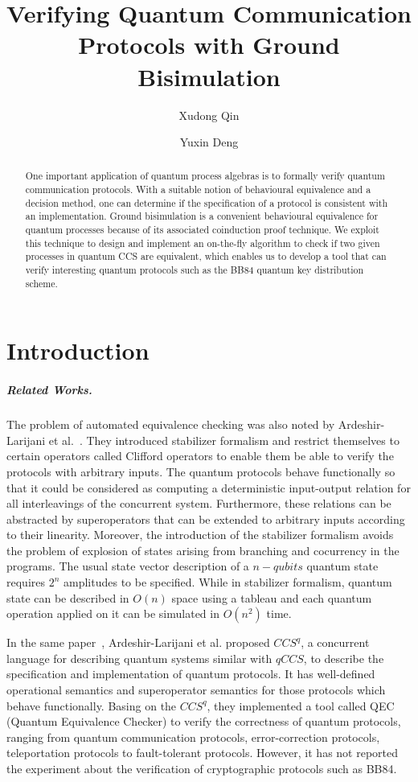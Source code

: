 \documentclass[a4paper,UKenglish,cleveref, autoref]{lipics-v2019}
\title{Verifying Quantum Communication Protocols with Ground Bisimulation}
\author{Xudong Qin}{Shanghai Key Laboratory of Trustworthy Computing, East China Normal University, China}{marsxd@gmail.com}{}{}
\author{Yuxin Deng}{Shanghai Key Laboratory of Trustworthy Computing, East China Normal University, China}{yxdeng@sei.ecnu.edu.cn}{}{}
\begin{document}
\maketitle

\begin{abstract}
	
One important application of quantum process algebras is to formally verify quantum communication protocols. With a suitable notion of behavioural equivalence and a decision method, one can determine if the specification of a protocol is consistent with an implementation. Ground bisimulation is a convenient behavioural equivalence for quantum processes because of its associated coinduction proof technique. We exploit this technique to design and implement an on-the-fly algorithm to check if two given processes in quantum CCS are equivalent, which enables us to develop a tool that can verify interesting quantum protocols such as the BB84 quantum key distribution scheme.
\end{abstract}

\section{Introduction}
\label{sec:introduction}


\subparagraph*{Related Works.} The problem of automated equivalence checking was also noted by Ardeshir-Larijani et al.~\cite{DBLP:journals/tocl/Ardeshir-Larijani18}. They introduced stabilizer formalism and restrict themselves to certain operators called
Clifford operators to enable them be able to verify the protocols with arbitrary inputs. The quantum protocols behave functionally so that it could be considered as computing a deterministic input-output relation for all interleavings of the concurrent system. Furthermore, these relations can be abstracted by superoperators that can be extended to arbitrary inputs according to their linearity. Moreover, the introduction of the stabilizer formalism avoids the problem of explosion of states arising from branching and cocurrency in the programs. The usual state vector description of a $n-qubits$ quantum state requires $2^n$ amplitudes to be specified. While in stabilizer formalism, quantum state can be described in $O(n)$ space using a tableau and each quantum operation applied on it can be simulated in $O(n^2)$ time.

In the same paper~\cite{DBLP:journals/tocl/Ardeshir-Larijani18}, Ardeshir-Larijani et al. proposed $CCS^q$, a concurrent
language for describing quantum systems similar with $qCCS$, to describe the specification and implementation of quantum protocols. It has well-defined operational semantics and superoperator semantics for those protocols which behave functionally. Basing on the $CCS^q$, they implemented a tool called QEC (Quantum Equivalence
Checker) to verify the correctness of quantum protocols, ranging from quantum communication protocols, error-correction protocols, teleportation protocols to fault-tolerant protocols. However, it has not reported the experiment about the verification of cryptographic protocols such as BB84. 
\end{document}

